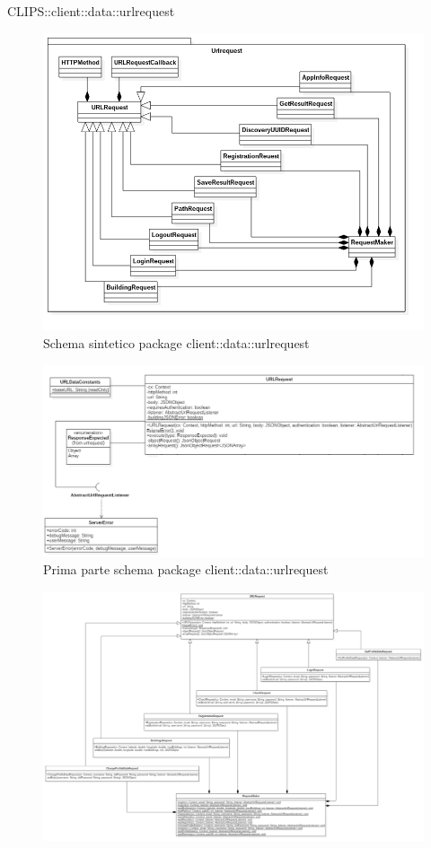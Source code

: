 \begin{componente}{CLIPS::client::data::urlrequest}
\begin{figure}[h!]
	\centering
	\includegraphics[scale=0.45]{img/package/png/client--urlrequest--min.png}
	\caption{Schema sintetico package client::data::urlrequest}
\end{figure}
\begin{figure}[h!]
\centering
\includegraphics[scale=0.5]{img/package/png/client--urlrequest1.png}
\caption{Prima parte schema package client::data::urlrequest}
 \end{figure}
 \begin{figure}[h!]
 	\centering
 	\includegraphics[scale=0.30]{img/package/png/client--urlrequest2.png}

\end{figure}
\end{componente}
